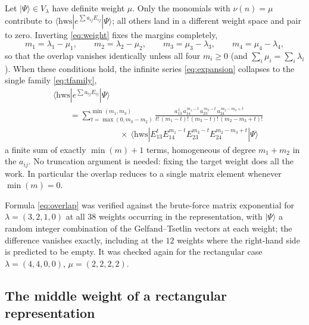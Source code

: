 \documentclass[12pt]{article}
\newcommand{\hws}{\mathrm{hws}}
\begin{document}
Let $|\Psi\rangle\in V_\lambda$ have definite weight $\mu$. Only the monomials
with $\nu(n)=\mu$ contribute to $\langle\hws|e^{\sum a_{ij}E_{ij}}|\Psi\rangle$;
all others land in a different weight space and pair to zero. Inverting
\eqref{eq:weight} fixes the margins completely,
\begin{equation}
m_1=\lambda_1-\mu_1,\qquad m_2=\lambda_2-\mu_2,\qquad
m_3=\mu_3-\lambda_3,\qquad m_4=\mu_4-\lambda_4 ,
\label{eq:forced-margins}
\end{equation}
so that the overlap vanishes identically unless all four $m_i\geq0$ (and
$\sum_i\mu_i=\sum_i\lambda_i$). When these conditions hold, the infinite series
\eqref{eq:expansion} collapses to the single family \eqref{eq:tfamily},
\begin{equation}
\boxed{\ \
\begin{aligned}
&\langle\hws|e^{\sum a_{ij}E_{ij}}|\Psi\rangle\\[2pt]
&\qquad=\sum_{t=\max(0,m_3-m_2)}^{\min(m_1,m_3)}
\frac{a_{13}^{\,t}\,a_{14}^{\,m_1-t}\,a_{23}^{\,m_3-t}\,a_{24}^{\,m_2-m_3+t}}
{t!\,(m_1-t)!\,(m_3-t)!\,(m_2-m_3+t)!}\\[2pt]
&\qquad\qquad\qquad\qquad\times\
\langle\hws|E_{13}^{t}E_{14}^{m_1-t}E_{23}^{m_3-t}E_{24}^{m_2-m_3+t}|\Psi\rangle
\end{aligned}
\ \ }
\label{eq:overlap}
\end{equation}
a finite sum of exactly $\min(m)+1$ terms, homogeneous of degree $m_1+m_2$ in the
$a_{ij}$. No truncation argument is needed: fixing the target weight does all the
work. In particular the overlap reduces to a single matrix element whenever
$\min(m)=0$.

Formula \eqref{eq:overlap} was verified against the brute-force matrix
exponential for $\lambda=(3,2,1,0)$ at all $38$ weights occurring in the
representation, with $|\Psi\rangle$ a random integer combination of the
Gelfand--Tsetlin vectors at each weight; the difference vanishes exactly,
including at the $12$ weights where the right-hand side is predicted to be
empty. It was checked again for the rectangular case $\lambda=(4,4,0,0)$,
$\mu=(2,2,2,2)$.

\subsection{The middle weight of a rectangular representation}
\end{document}
